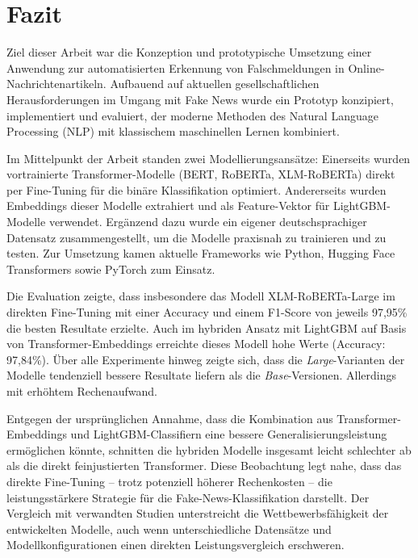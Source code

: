 \chapter{Fazit}
\label{chap:fazit}

Ziel dieser Arbeit war die Konzeption und prototypische Umsetzung einer Anwendung zur automatisierten Erkennung von Falschmeldungen in Online-Nachrichtenartikeln. 
Aufbauend auf aktuellen gesellschaftlichen Herausforderungen im Umgang mit Fake News wurde ein Prototyp konzipiert, 
implementiert und evaluiert, der moderne Methoden des Natural Language Processing (NLP) mit klassischem maschinellen Lernen kombiniert.

Im Mittelpunkt der Arbeit standen zwei Modellierungsansätze: Einerseits wurden vortrainierte Transformer-Modelle (BERT, RoBERTa, XLM-RoBERTa) 
direkt per Fine-Tuning für die binäre Klassifikation optimiert. Andererseits wurden Embeddings dieser Modelle extrahiert und als Feature-Vektor 
für LightGBM-Modelle verwendet. Ergänzend dazu wurde ein eigener deutschsprachiger Datensatz zusammengestellt, um die Modelle praxisnah zu trainieren und zu testen.
Zur Umsetzung kamen aktuelle Frameworks wie Python, Hugging Face Transformers sowie PyTorch zum Einsatz.

Die Evaluation zeigte, dass insbesondere das Modell XLM-RoBERTa-Large im direkten Fine-Tuning mit einer Accuracy und einem F1-Score von jeweils 97,95\% 
die besten Resultate erzielte. Auch im hybriden Ansatz mit LightGBM auf Basis von Transformer-Embeddings erreichte dieses Modell hohe Werte (Accuracy: 97,84\%). 
Über alle Experimente hinweg zeigte sich, dass die \textit{Large}-Varianten der Modelle tendenziell bessere Resultate liefern als die \textit{Base}-Versionen. 
Allerdings mit erhöhtem Rechenaufwand.

Entgegen der ursprünglichen Annahme, dass die Kombination aus Transformer-Embeddings und LightGBM-Classifiern eine bessere Generalisierungsleistung %
ermöglichen könnte, schnitten die hybriden Modelle insgesamt leicht schlechter ab als die direkt feinjustierten Transformer. 
Diese Beobachtung legt nahe, dass das direkte Fine-Tuning – trotz potenziell höherer Rechenkosten – die leistungsstärkere Strategie für die Fake-News-Klassifikation 
darstellt. Der Vergleich mit verwandten Studien unterstreicht die Wettbewerbsfähigkeit der entwickelten Modelle, auch wenn unterschiedliche Datensätze und 
Modellkonfigurationen einen direkten Leistungsvergleich erschweren.

